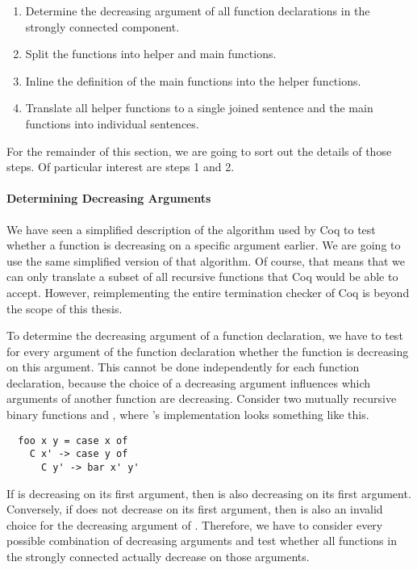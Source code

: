 \begin{enumerate}
  \item
  Determine the decreasing argument of all function declarations in the strongly connected component.
  \item
  Split the functions into helper and main functions.
  \item
  Inline the definition of the main functions into the helper functions.
  \item
  Translate all helper functions to a single joined  sentence and the main functions into individual  sentences.
\end{enumerate}

For the remainder of this section, we are going to sort out the details of those steps.
Of particular interest are steps 1 and 2.

\paragraph{Determining Decreasing Arguments}
We have seen a simplified description of the algorithm used by Coq to test whether a function is decreasing on a specific argument earlier.
We are going to use the same simplified version of that algorithm.
Of course, that means that we can only translate a subset of all recursive functions that Coq would be able to accept.
However, reimplementing the entire termination checker of Coq is beyond the scope of this thesis.

To determine the decreasing argument of a function declaration, we have to test for every argument of the function declaration whether the function is decreasing on this argument.
This cannot be done independently for each function declaration, because the choice of a decreasing argument influences which arguments of another function are decreasing.
Consider two mutually recursive binary functions  and , where 's implementation looks something like this.
\begin{verbatim}
  foo x y = case x of
    C x' -> case y of
      C y' -> bar x' y'
\end{verbatim}
If  is decreasing on its first argument, then  is also decreasing on its first argument.
Conversely, if  does not decrease on its first argument, then  is also an invalid choice for the decreasing argument of .
Therefore, we have to consider every possible combination of decreasing arguments and test whether all functions in the strongly connected actually decrease on those arguments.


